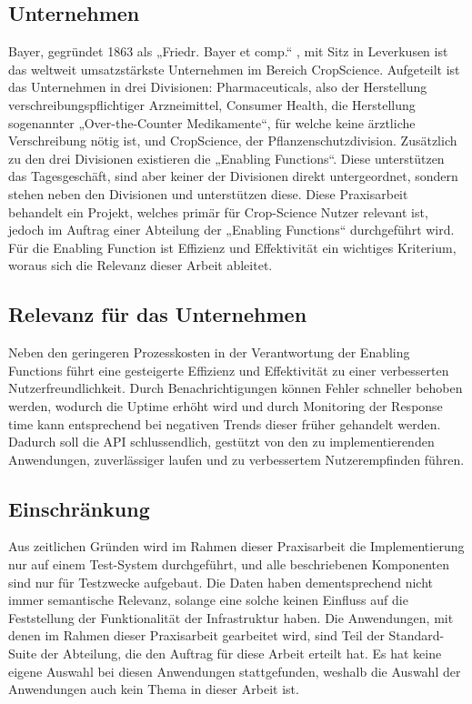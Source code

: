 \subsection{Unternehmen}
Bayer, gegründet 1863 als „Friedr. Bayer et comp.“ , mit Sitz in Leverkusen ist das weltweit umsatzstärkste Unternehmen im Bereich CropScience. Aufgeteilt ist das Unternehmen in drei Divisionen: Pharmaceuticals, also der Herstellung verschreibungspflichtiger Arzneimittel, Consumer Health, die Herstellung sogenannter „Over-the-Counter Medikamente“, für welche keine ärztliche Verschreibung nötig ist, und CropScience, der Pflanzenschutzdivision. Zusätzlich zu den drei Divisionen existieren die „Enabling Functions“. Diese unterstützen das Tagesgeschäft, sind aber keiner der Divisionen direkt untergeordnet, sondern stehen neben den Divisionen und unterstützen diese. Diese Praxisarbeit behandelt ein Projekt, welches primär für Crop-Science Nutzer relevant ist, jedoch im Auftrag einer Abteilung der „Enabling Functions“ durchgeführt wird. Für die Enabling Function ist Effizienz und Effektivität ein wichtiges Kriterium, woraus sich die Relevanz dieser Arbeit ableitet.
\subsection{Relevanz für das Unternehmen}
Neben den geringeren Prozesskosten in der Verantwortung der Enabling Functions führt eine gesteigerte Effizienz und Effektivität zu einer verbesserten Nutzerfreundlichkeit. Durch Benachrichtigungen können Fehler schneller behoben werden, wodurch die Uptime erhöht wird und durch Monitoring der Response time kann entsprechend bei negativen Trends dieser früher gehandelt werden. Dadurch soll die API schlussendlich, gestützt von den zu implementierenden Anwendungen, zuverlässiger laufen und zu verbessertem Nutzerempfinden führen.
\subsection{Einschränkung}
Aus zeitlichen Gründen wird im Rahmen dieser Praxisarbeit die Implementierung nur auf einem Test-System durchgeführt, und alle beschriebenen Komponenten sind nur für Testzwecke aufgebaut. Die Daten haben dementsprechend nicht immer semantische Relevanz, solange eine solche keinen Einfluss auf die Feststellung der Funktionalität der Infrastruktur haben. Die Anwendungen, mit denen im Rahmen dieser Praxisarbeit gearbeitet wird, sind Teil der Standard-Suite der Abteilung, die den Auftrag für diese Arbeit erteilt hat. Es hat keine eigene Auswahl bei diesen Anwendungen stattgefunden, weshalb die Auswahl der Anwendungen auch kein Thema in dieser Arbeit ist.
